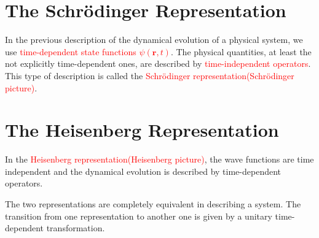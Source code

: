 \documentclass[11pt,a4paper]{article}
\renewcommand{\vec}[1]{\boldsymbol{#1}}
\begin{document}
\section{The Schr\"odinger Representation}
In the previous description of the dynamical evolution of a physical system, we use \textcolor{red}{time-dependent state functions $\psi(\vec{r}, t)$}. The physical quantities, at least the not explicitly time-dependent ones, are described by \textcolor{red}{time-independent operators}. This type of description is called the \textcolor{red}{Schr\"odinger representation(Schr\"odinger picture)}.


\section{The Heisenberg Representation}
In the \textcolor{red}{Heisenberg representation(Heisenberg picture)}, the wave functions are time independent and the dynamical evolution is described by time-dependent operators.

The two representations are completely equivalent in describing a system. The transition from one representation to another one is given by a unitary time-dependent transformation. 
\end{document}
